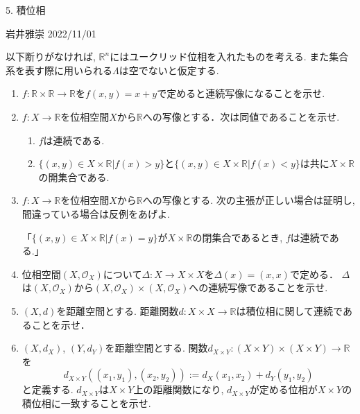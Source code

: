 \documentclass[dvipdfmx,a4paper,11pt]{article}
\newcommand{\R}{\mathbb{R}}
\theoremstyle{definition}
\begin{document}

\begin{center}
{\Large 5. 積位相}
\end{center}

\begin{flushright}
 岩井雅崇 2022/11/01
\end{flushright}
以下断りがなければ, $\R^{n}$にはユークリッド位相を入れたものを考える. また集合系を表す際に用いられる$\Lambda$は空でないと仮定する. 
\begin{enumerate}[ label=\textbf{問}5.\arabic*]

\item $f : \R \times \R \rightarrow \R$を$f(x,y)=x+y$で定めると連続写像になることを示せ.
\item  $f : X \rightarrow \R$を位相空間$X$から$\R$への写像とする．次は同値であることを示せ.
	\begin{enumerate}
	\item $f$は連続である.
	\item $\{ (x,y) \in X \times \R | f(x) >y\}$と$\{ (x,y) \in X \times \R | f(x) <y\}$は共に$X \times \R$の開集合である. 
	\end{enumerate}
\item  $f : X \rightarrow \R$を位相空間$X$から$\R$への写像とする. 次の主張が正しい場合は証明し, 間違っている場合は反例をあげよ.

「$\{ (x,y) \in X \times \R | f(x) =y\}$が$X \times \R$の閉集合であるとき, $f$は連続である.」

\item 位相空間$(X, \mathscr{O}_X )$について$\Delta : X \rightarrow X \times X$を$\Delta(x)=(x,x)$で定める．
$\Delta$は$(X, \mathscr{O}_X )$から$(X, \mathscr{O}_X )\times (X, \mathscr{O}_X )$への連続写像であることを示せ.

\item $(X,d)$を距離空間とする. 距離関数$d : X \times X \rightarrow \R$は積位相に関して連続であることを示せ．
\item $(X,d_X)$, $(Y,d_Y)$を距離空間とする. 関数$d_{X \times Y} : (X \times Y)\times (X \times Y) \rightarrow \R$を
$$
d_{X \times Y} ( (x_1, y_1) ,  (x_2, y_2)) :=  d_X (x_1, x_2) + d_Y(y_1, y_2)
$$
と定義する. $d_{X \times Y} $は$X \times Y$上の距離関数になり,  $d_{X \times Y} $が定める位相が$X \times Y$の積位相に一致することを示せ. 


\end{enumerate}
\end{document}
